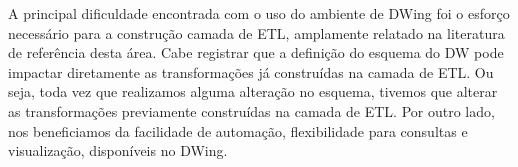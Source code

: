 A principal dificuldade encontrada com o uso do ambiente de DWing foi o esforço necessário para a construção camada de ETL, amplamente relatado na literatura de referência desta área. Cabe registrar que a definição do esquema do DW pode impactar diretamente as transformações já construídas na camada de ETL. Ou seja, toda vez que realizamos alguma alteração no esquema, tivemos que alterar as transformações previamente construídas na camada de ETL.
Por outro lado, nos beneficiamos da facilidade de automação, flexibilidade para consultas e visualização, disponíveis no DWing.


